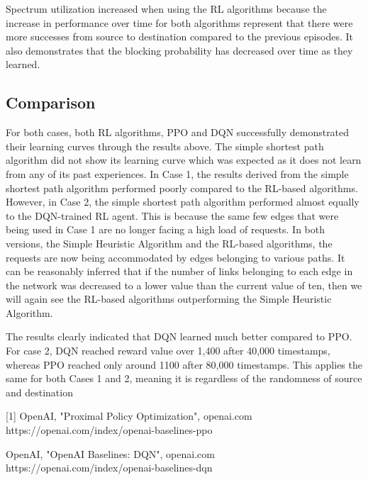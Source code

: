 \documentclass[conference]{IEEEtran}
\begin{document}
 Spectrum utilization increased when using the RL algorithms because the increase in performance over time for both algorithms represent that there were more successes from source to destination compared to the previous episodes. It also demonstrates that the blocking probability has decreased over time as they learned.
\subsection{Comparison}
For both cases, both RL algorithms, PPO and DQN successfully demonstrated their learning curves through the results above. The simple shortest path algorithm did not show its learning curve which was expected as it does not learn from any of its past experiences. In Case 1, the results derived from the simple shortest path algorithm performed poorly compared to the RL-based algorithms. However, in Case 2, the simple shortest path algorithm performed almost equally to the DQN-trained RL agent. This is because the same few edges that were being used in Case 1 are no longer facing a high load of requests. In both versions, the Simple Heuristic Algorithm and the RL-based algorithms, the requests are now being accommodated by edges belonging to various paths. It can be reasonably inferred that if the number of links belonging to each edge in the network was decreased to a lower value than the current value of ten, then we will again see the RL-based algorithms outperforming the Simple Heuristic Algorithm.

The results clearly indicated that DQN learned much better compared to PPO. For case 2, DQN reached reward value over 1,400 after 40,000 timestamps, whereas PPO reached only around 1100 after 80,000 timestamps. This applies the same for both Cases 1 and 2, meaning it is regardless of the randomness of source and destination



[1] OpenAI, "Proximal Policy Optimization", openai.com
https://openai.com/index/openai-baselines-ppo

\noindent [2] OpenAI, "OpenAI Baselines: DQN", openai.com
https://openai.com/index/openai-baselines-dqn
\end{document}
